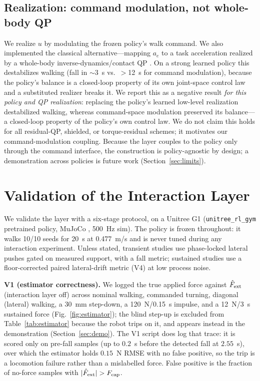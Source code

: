 \documentclass[journal]{IEEEtran}
\begin{document}
\subsection{Realization: command modulation, not whole-body QP}
\label{sec:realize}

We realize $u$ by modulating the frozen policy's walk command. We also implemented the classical alternative---mapping $a_e$ to a task acceleration realized by a whole-body inverse-dynamics/contact QP \cite{r17}. On a strong learned policy this destabilizes walking (fall in $\sim 3$~s vs.\ $>$12~s for command modulation), because the policy's balance is a closed-loop property of its own joint-space control law and a substituted realizer breaks it. We report this as a negative result \emph{for this policy and QP realization}: replacing the policy's learned low-level realization destabilized walking, whereas command-space modulation preserved its balance---a closed-loop property of the policy's own control law. We do not claim this holds for all residual-QP, shielded, or torque-residual schemes; it motivates our command-modulation coupling. Because the layer couples to the policy only through the command interface, the construction is policy-agnostic by design; a demonstration across policies is future work (Section~\ref{sec:limits}).

\section{Validation of the Interaction Layer}
\label{sec:val}

We validate the layer with a six-stage protocol, on a Unitree G1 (\texttt{unitree\_rl\_gym} 
pretrained policy, MuJoCo \cite{r18}, 500~Hz sim). The policy is frozen throughout: it walks 
10/10 seeds for 20~s at 0.477~m/s and is never tuned during any interaction experiment. 
Unless stated, transient studies use phase-locked lateral pushes gated on measured support, 
with a fall metric; sustained studies use a floor-corrected paired lateral-drift metric
(V4) at low process noise.

\textbf{V1 (estimator correctness).} We logged the true applied force against $\hat F_{\rm ext}$ (interaction layer off) across nominal walking, commanded turning, diagonal (lateral) walking, a 30~mm step-down, a 120~N/0.15~s impulse, and a 12~N/3~s sustained force (Fig.~\ref{fig:estimator}); the blind step-up is excluded from Table~\ref{tab:estimator} because the robot trips on it, and appears instead in the demonstration (Section~\ref{sec:demo}). The V1 script does log that trace: it is scored only on pre-fall samples (up to $0.2$~s before the detected fall at $2.55$~s), over which the estimator holds $0.15$~N RMSE with no false positive, so the trip is a locomotion failure rather than a mislabelled force. False positive is the fraction of no-force samples with $|\hat F_{\rm ext}|>F_{\rm cap}$.
\end{document}

